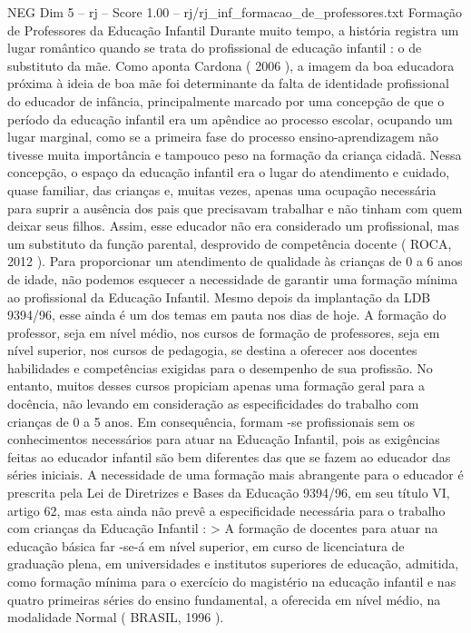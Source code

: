 \begin{textsample}{NEG Dim 5 – rj – Score 1.00 – rj/rj\_inf\_formacao\_de\_professores.txt}  \label{ex:f5_neg_096}
Formação de Professores da Educação Infantil Durante muito tempo, a história registra um lugar romântico quando se trata do profissional de educação infantil : o de substituto da mãe.
Como aponta Cardona ( 2006 ), a imagem da boa educadora próxima à ideia de boa mãe foi determinante da falta de identidade profissional do educador de infância, principalmente marcado por uma concepção de que o período da educação infantil era um apêndice ao processo escolar, ocupando um lugar marginal, como se a primeira fase do processo ensino-aprendizagem não tivesse muita importância e tampouco peso na formação da criança cidadã.
Nessa concepção, o espaço da educação infantil era o lugar do atendimento e cuidado, quase familiar, das crianças e, muitas vezes, apenas uma ocupação necessária para suprir a ausência dos pais que precisavam trabalhar e não tinham com quem deixar seus filhos.
Assim, esse educador não era considerado um profissional, mas um substituto da função parental, desprovido de competência docente ( ROCA, 2012 ).
Para proporcionar um atendimento de qualidade às crianças de 0 a 6 anos de idade, não podemos esquecer a necessidade de garantir uma formação mínima ao profissional da Educação Infantil.
Mesmo depois da implantação da LDB 9394/96, esse ainda é um dos temas em pauta nos dias de hoje.
A formação do professor, seja em nível médio, nos cursos de formação de professores, seja em nível superior, nos cursos de pedagogia, se destina a oferecer aos docentes habilidades e competências exigidas para o desempenho de sua profissão.
No entanto, muitos desses cursos propiciam apenas uma formação geral para a docência, não levando em consideração as especificidades do trabalho com crianças de 0 a 5 anos.
Em consequência, formam -se profissionais sem os conhecimentos necessários para atuar na Educação Infantil, pois as exigências feitas ao educador infantil são bem diferentes das que se fazem ao educador das séries iniciais.
A necessidade de uma formação mais abrangente para o educador é prescrita pela Lei de Diretrizes e Bases da Educação 9394/96, em seu título VI, artigo 62, mas esta ainda não prevê a especificidade necessária para o trabalho com crianças da Educação Infantil : > A formação de docentes para atuar na educação básica far -se-á em nível superior, em curso de licenciatura de graduação plena, em universidades e institutos superiores de educação, admitida, como formação mínima para o exercício do magistério na educação infantil e nas quatro primeiras séries do ensino fundamental, a oferecida em nível médio, na modalidade Normal ( BRASIL, 1996 ).

\end{textsample}
